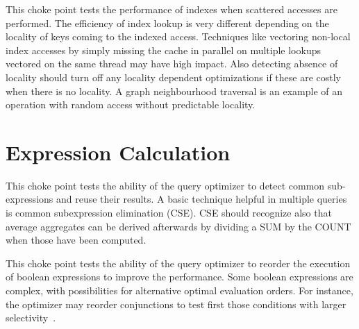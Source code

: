 This choke point tests the performance of indexes when scattered accesses are performed. The efficiency of index lookup is very different depending on the locality of keys coming to the indexed access.
Techniques like vectoring non-local index accesses by simply missing the cache in parallel on multiple lookups vectored on the same thread may have high impact.
Also detecting absence of locality should turn off any locality dependent optimizations if these are costly when there is no locality. A graph neighbourhood traversal is an example of an operation with random access without predictable locality.




\section{Expression Calculation}



This choke point tests the ability of the query optimizer to detect common sub-expressions and reuse their results. A basic technique helpful in multiple queries is common subexpression elimination (CSE).
CSE should recognize also that average aggregates can be derived afterwards by dividing a SUM by the COUNT when those have been computed.





This choke point tests the ability of the query optimizer to reorder the execution of boolean expressions to improve the performance. Some boolean expressions are complex, with possibilities for alternative optimal evaluation orders.
For instance, the optimizer may reorder conjunctions to test first those conditions with larger selectivity~\cite{DBLP:conf/vldb/Moerkotte98}.



